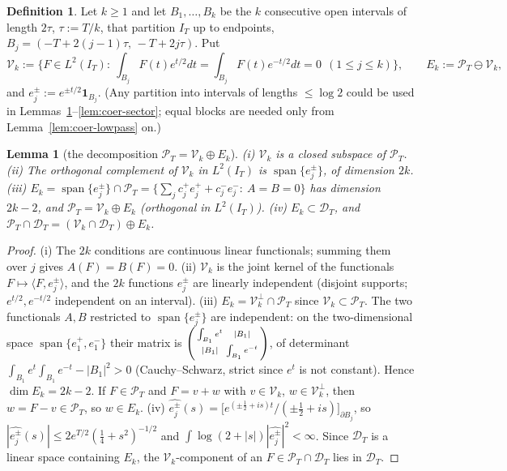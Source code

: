 \documentclass[11pt]{amsart}
\newtheorem{lemma}[theorem]{Lemma}
\theoremstyle{definition}
\newtheorem{definition}[theorem]{Definition}
\theoremstyle{remark}
\newcommand{\PT}{\mathcal P_T}
\newcommand{\IT}{I_T}
\begin{document}
\begin{definition}\label{def:coer-V}
Let $k\ge1$ and let $B_1,\dots,B_k$ be the $k$ consecutive open intervals of length $2\tau$,
$\tau:=T/k$, that partition $\IT$ up to endpoints, $B_j=(-T+2(j-1)\tau,\,-T+2j\tau)$. Put
\[
\mathcal V_k:=\Big\{F\in L^2(\IT):\ \int_{B_j}F(t)e^{t/2}dt=\int_{B_j}F(t)e^{-t/2}dt=0\ \ (1\le j\le k)\Big\},
\qquad E_k:=\PT\ominus\mathcal V_k ,
\]
and $e_j^\pm:=e^{\pm t/2}\mathbf 1_{B_j}$. (Any partition into intervals of lengths $\le\log2$ could be
used in Lemmas~\ref{lem:coer-decomp}--\ref{lem:coer-sector}; equal blocks are needed only from
Lemma~\ref{lem:coer-lowpass} on.)
\end{definition}

\begin{lemma}[the decomposition $\PT=\mathcal V_k\oplus E_k$]\label{lem:coer-decomp}
\emph{(i)} $\mathcal V_k$ is a closed subspace of $\PT$. \emph{(ii)} The orthogonal complement of
$\mathcal V_k$ in $L^2(\IT)$ is $\operatorname{span}\{e_j^\pm\}$, of dimension $2k$.
\emph{(iii)} $E_k=\operatorname{span}\{e_j^\pm\}\cap\PT=\{\sum_jc_j^+e_j^++c_j^-e_j^-:\ A=B=0\}$ has
dimension $2k-2$, and $\PT=\mathcal V_k\oplus E_k$ (orthogonal in $L^2(\IT)$).
\emph{(iv)} $E_k\subset\mathcal D_T$, and $\PT\cap\mathcal D_T=(\mathcal V_k\cap\mathcal D_T)\oplus E_k$.
\end{lemma}
\begin{proof}
(i) The $2k$ conditions are continuous linear functionals; summing them over $j$ gives $A(F)=B(F)=0$.
(ii) $\mathcal V_k$ is the joint kernel of the functionals $F\mapsto\langle F,e_j^\pm\rangle$, and the $2k$
functions $e_j^\pm$ are linearly independent (disjoint supports; $e^{t/2},e^{-t/2}$ independent on an
interval). (iii) $E_k=\mathcal V_k^\perp\cap\PT$ since $\mathcal V_k\subset\PT$. The two functionals
$A,B$ restricted to $\operatorname{span}\{e_j^\pm\}$ are independent: on the two-dimensional space
$\operatorname{span}\{e_1^+,e_1^-\}$ their matrix is
$\begin{psmallmatrix}\int_{B_1}e^t&|B_1|\\|B_1|&\int_{B_1}e^{-t}\end{psmallmatrix}$, of determinant
$\int_{B_1}e^t\int_{B_1}e^{-t}-|B_1|^2>0$ (Cauchy--Schwarz, strict since $e^t$ is not constant). Hence
$\dim E_k=2k-2$. If $F\in\PT$ and $F=v+w$ with $v\in\mathcal V_k$, $w\in\mathcal V_k^\perp$, then
$w=F-v\in\PT$, so $w\in E_k$. (iv) $\widehat{e_j^\pm}(s)=\big[e^{(\pm\frac12+is)t}/(\pm\frac12+is)\big]_{\partial B_j}$,
so $|\widehat{e_j^\pm}(s)|\le2e^{T/2}(\frac14+s^2)^{-1/2}$ and $\int\log(2+|s|)|\widehat{e_j^\pm}|^2<\infty$.
Since $\mathcal D_T$ is a linear space containing $E_k$, the $\mathcal V_k$-component of an $F\in\PT\cap\mathcal D_T$
lies in $\mathcal D_T$.
\end{proof}
\end{document}
